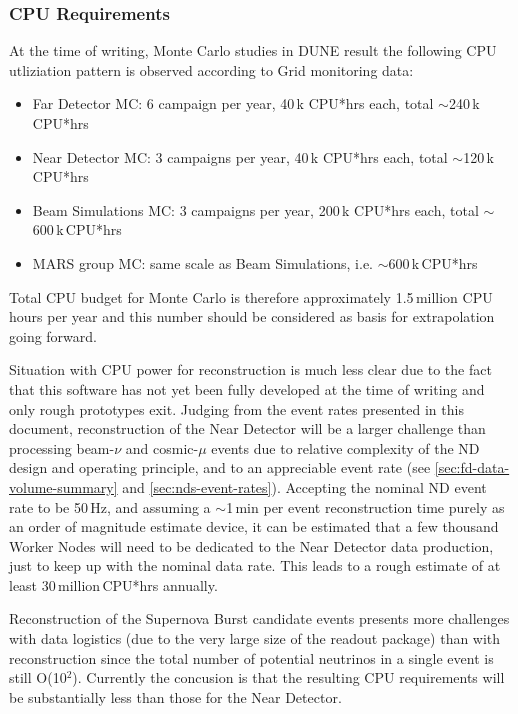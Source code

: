 \subsubsection{CPU Requirements}
At the time of writing, Monte Carlo studies in DUNE result the following CPU utliziation pattern is observed according to Grid monitoring data:
\begin{itemize}

\item Far Detector MC: 6 campaign per year, 40\,k CPU*hrs each, total $\sim$240\,k\,CPU*hrs

\item Near Detector MC: 3 campaigns per year, 40\,k CPU*hrs each, total $\sim$120\,k\,CPU*hrs

\item Beam Simulations MC: 3 campaigns per year, 200\,k CPU*hrs each, total $\sim$600\,k\,CPU*hrs

\item MARS group MC: same scale as Beam Simulations, i.e. $\sim$600\,k\,CPU*hrs

\end{itemize}

\noindent
Total CPU budget for Monte Carlo is therefore approximately 1.5\,million CPU hours per year and this number
should be considered as basis for extrapolation going forward.

Situation with CPU power for reconstruction is much less clear due to the fact that this software has not yet been fully
developed at the time of writing and only rough prototypes exit. Judging from the event rates presented in this document,
reconstruction of the Near Detector will be a larger challenge than processing beam-$\nu$ and cosmic-$\mu$ events due
to relative complexity of the ND design and operating principle, and to an appreciable event rate
(see \ref{sec:fd-data-volume-summary} and \ref{sec:nds-event-rates}). Accepting the nominal ND event rate to be 50\,Hz,
and assuming a $\sim$1\,min per event reconstruction time purely as an order of magnitude estimate device, it can be estimated
that a few thousand Worker Nodes will need to be dedicated to the Near Detector data production, just to keep up with the nominal
data rate. This leads to a rough estimate of at least 30\,million\,CPU*hrs annually.

Reconstruction of the Supernova Burst candidate events presents more challenges with data logistics (due to the very large size
of the readout package) than with reconstruction since the total number of potential neutrinos in a single event is still O(10$^2$).
Currently the concusion is that the resulting CPU requirements will be substantially less than those for the Near Detector.





